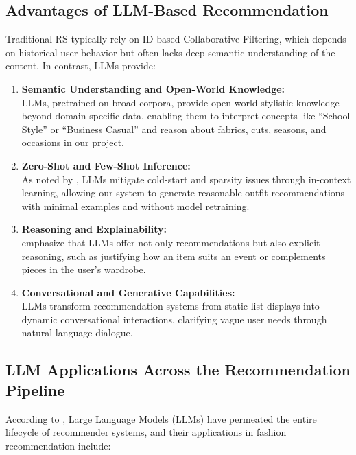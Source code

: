\subsection{Advantages of LLM-Based Recommendation}
Traditional RS typically rely on ID-based Collaborative Filtering, which depends on historical user behavior but often lacks deep semantic understanding of the content. In contrast, LLMs provide:
\begin{enumerate}[label=(\alph*)]
    \item \textbf{Semantic Understanding and Open-World Knowledge:}\\
    LLMs, pretrained on broad corpora, provide open-world stylistic knowledge beyond domain-specific data, enabling them to interpret concepts like “School Style” or “Business Casual” and reason about fabrics, cuts, seasons, and occasions in our project.
    \item \textbf{Zero-Shot and Few-Shot Inference:}\\
    As noted by \cite{wu2023survey}, LLMs mitigate cold-start and sparsity issues through in-context learning, allowing our system to generate reasonable outfit recommendations with minimal examples and without model retraining.
    \item \textbf{Reasoning and Explainability:}\\
    \cite{lin2023benefit} emphasize that LLMs offer not only recommendations but also explicit reasoning, such as justifying how an item suits an event or complements pieces in the user’s wardrobe.
    \item \textbf{Conversational and Generative Capabilities:}\\
    LLMs transform recommendation systems from static list displays into dynamic conversational interactions, clarifying vague user needs through natural language dialogue.
\end{enumerate}



\subsection{LLM Applications Across the Recommendation Pipeline}
According to \cite{lin2023benefit}, Large Language Models (LLMs) have permeated the entire lifecycle of recommender systems, and their applications in fashion recommendation include:


